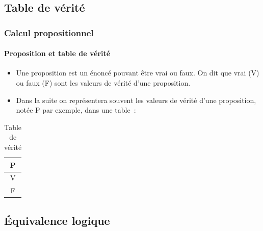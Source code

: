 \documentclass[10pt,notheorems]{beamer}
\theoremstyle{plain}
\theoremstyle{definition} %
\begin{document}
\subsection{Table de vérité}

\begin{frame}
  \frametitle{Calcul propositionnel}
  \framesubtitle{Proposition et table de vérité}
  \hypertarget{slide_proposition_et_table_de_verite}{}

  \begin{itemize}

  \item Une proposition est un énoncé pouvant être vrai ou faux. On
    dit que vrai (V) ou faux (F) sont les valeurs de vérité d'une
    proposition.\newline

  \item Dans la suite on représentera souvent les valeurs de vérité
    d'une proposition, notée P par exemple, dans une table~:

  \end{itemize}

  \begin{table}[H]

    \centering
    \begin{tabular}[H]{|c|}
      \hline
      P \\ \hline
      V \\
      F \\
      \hline\hline
    \end{tabular}
    \caption{Table de vérité}
    \label{tab:verite}
  \end{table}

\end{frame}

\subsection{Équivalence logique}
\end{document}
